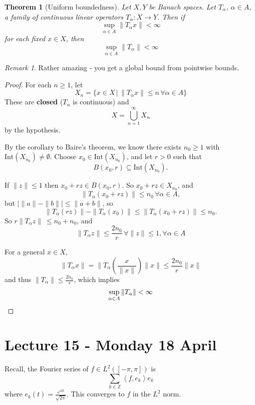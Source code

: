 \documentclass[10pt, oneside, reqno]{amsart}
\theoremstyle{plain}%
\newtheorem{thm}{Theorem}[section]
\theoremstyle{definition}
\theoremstyle{remark}
\newtheorem*{rem}{Remark}
\newcommand{\given}{ \, | \,}
\newcommand{\Z}{\mathbb{Z}}
\newcommand{\iprod}[1]{\left\langle #1 \right\rangle}
\begin{document}
\begin{thm}[Uniform boundedness]
    Let $X, Y$ be Banach spaces.  Let $T_\alpha$, $\alpha \in A$, a family of continuous linear operators $T_\alpha : X \rightarrow Y$.  Then if \[
        \sup_{\alpha \in A} \| T_\alpha x \| < \infty
    \] for each fixed $x \in X$, then \[
        \sup_{\alpha \in A} \| T_\alpha \| < \infty
    \]
\end{thm}
\begin{rem}
    Rather amazing - you get a global bound from pointwise bounds.
\end{rem}
\begin{proof}
    For each $n \geq 1$, let \[
        X_n = \{ x \in X \given \| T_\alpha x \| \leq n \, \forall \alpha \in A \}
    \]  These are \textbf{closed} ($T_{\alpha}$ is continuous) and \[
        X = \bigcup_{n=1}^\infty X_n
    \] by the hypothesis.
    
    By the corollary to Baire's theorem, we know there exists $n_0 \geq 1$ with $\text{Int}(X_{n_0}) \neq \emptyset$.  Choose $x_0 \in \text{Int}(X_{n_0})$, and let $r > 0$ such that \[
        B(x_0, r) \subseteq \text{Int}(X_{n_0}).  
    \]  
    
    If $\| z \| \leq 1$ then $x_0 + rz \in \overline B (x_0, r)$. So $x_0 + rz \in X_{n_0}$, and \[
        \| T_\alpha(x_0 + rz) \| \leq n_0 \, \forall \alpha \in A,
    \]  but $| \| a \| - \| b \| | \leq \| a + b \|$, so \[
        \| T_\alpha (rz) \| - \| T_\alpha (x_0) \| \leq \| T_\alpha (x_0 + rz) \| \leq n_0.
    \]
    So $r \| T_\alpha z \| \ \leq n_0 + n_0$, and \[
        \| T_\alpha z \| \leq \frac{2 n_0}{r} \, \forall \| z \| \leq 1, \forall \alpha \in A
    \]
    
    For a general $x \in X$, \[
        \| T_\alpha x \| = \| T_\alpha ( \frac{x}{\| x \|}) \| x \| \leq \frac{2 n_0}{r} \| x \|
    \] and thus $\|T_\alpha \| \leq \frac{2 n_0}{r}$, which implies \[
        \sup_{\alpha \in A} \| T_\alpha \| < \infty \qedhere
    \]
    
    
\end{proof}

\section{Lecture 15 - Monday 18 April} %
\label{sec:lecture_15_monday_18_april}
Recall, the Fourier series of $f \in L^2([-\pi, \pi])$ is \[
    \sum_{k \in \Z} \iprod{f, e_k} e_k
\] where $e_k(t) = \frac{e^{ikt}}{\sqrt{2 \pi}}$.  This converges to $f$ in the $L^2$ norm.
\end{document}

